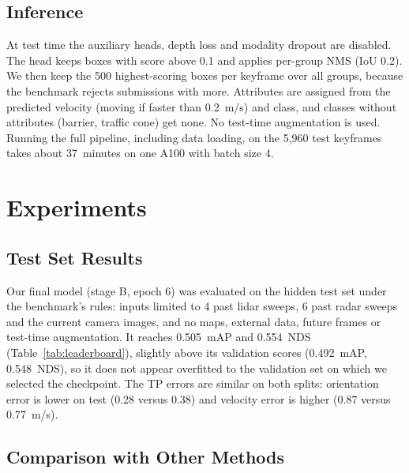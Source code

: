 \documentclass[conference]{IEEEtran}
\begin{document}
\subsection{Inference}

At test time the auxiliary heads, depth loss and modality dropout are disabled. The head keeps boxes with score above
0.1 and applies per-group NMS (IoU 0.2). We then keep the 500 highest-scoring boxes per keyframe over all groups,
because the benchmark rejects submissions with more. Attributes are assigned from the predicted velocity (moving if
faster than 0.2~m/s) and class, and classes without attributes (barrier, traffic cone) get none. No test-time
augmentation is used. Running the full pipeline, including data loading, on the 5{,}960 test keyframes takes about
37~minutes on one A100 with batch size 4.

\section{Experiments}

\subsection{Test Set Results}


Our final model (stage B, epoch 6) was evaluated on the hidden test set under the benchmark's rules: inputs limited
to 4 past lidar sweeps, 6 past radar sweeps and the current camera images, and no maps, external data, future frames
or test-time augmentation. It reaches 0.505~mAP and 0.554~NDS (Table~\ref{tab:leaderboard}), slightly above its
validation scores (0.492~mAP, 0.548~NDS), so it does not appear overfitted to the validation set on which we selected
the checkpoint. The TP errors are similar on both splits: orientation error is lower on test (0.28 versus 0.38) and
velocity error is higher (0.87 versus 0.77~m/s).

\subsection{Comparison with Other Methods}
\end{document}
